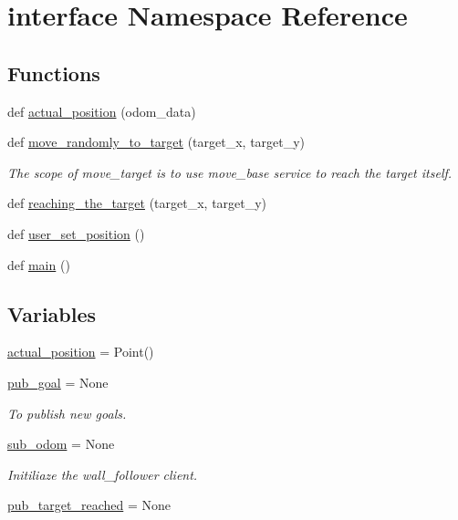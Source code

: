 \hypertarget{namespaceinterface}{}\section{interface Namespace Reference}
\label{namespaceinterface}
\subsection*{Functions}
\begin{DoxyCompactItemize}
\item 
def \hyperlink{namespaceinterface_a4dd15fe19a2580f21d8db65f681e01d0}{actual\+\_\+position} (odom\+\_\+data)
\item 
def \hyperlink{namespaceinterface_afb9c8042f33be80f7d047c827902cf6f}{move\+\_\+randomly\+\_\+to\+\_\+target} (target\+\_\+x, target\+\_\+y)
\begin{DoxyCompactList}\small\item\em The scope of move\+\_\+target is to use move\+\_\+base service to reach the target itself. \end{DoxyCompactList}\item 
def \hyperlink{namespaceinterface_a5307e508f28944b1b1b67cd5e9d16d60}{reaching\+\_\+the\+\_\+target} (target\+\_\+x, target\+\_\+y)
\item 
def \hyperlink{namespaceinterface_ae795c613b93f173e3b867be138002990}{user\+\_\+set\+\_\+position} ()
\item 
def \hyperlink{namespaceinterface_ac84656acec70183a4ef276f4a3343971}{main} ()
\end{DoxyCompactItemize}
\subsection*{Variables}
\begin{DoxyCompactItemize}
\item 
\hyperlink{namespaceinterface_a7e2f9384bca70d8ebd012646492277b3}{actual\+\_\+position} = Point()
\item 
\hyperlink{namespaceinterface_a1de259b3c06e4f436bbade32c75c9318}{pub\+\_\+goal} = None
\begin{DoxyCompactList}\small\item\em To publish new goals. \end{DoxyCompactList}\item 
\hyperlink{namespaceinterface_ac9f12ff0de8248506bf532b6874750e7}{sub\+\_\+odom} = None
\begin{DoxyCompactList}\small\item\em Initiliaze the wall\+\_\+follower client. \end{DoxyCompactList}\item 
\hyperlink{namespaceinterface_a4709d1a9f45323d007767a3b7c4725f5}{pub\+\_\+target\+\_\+reached} = None
\end{DoxyCompactItemize}


